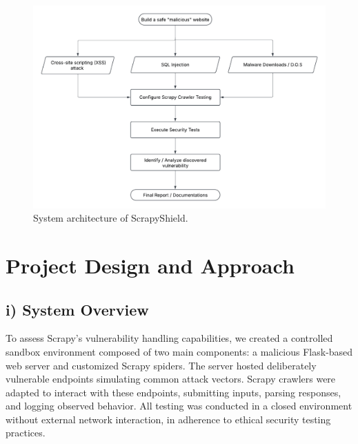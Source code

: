 \begin{figure}[!t]
  \centering
  \includegraphics[width=\textwidth]{figures/blockarch.png}
  \caption{System architecture of ScrapyShield.}
  \label{fig:architecture}
\end{figure}

\section{Project Design and Approach}

\subsection{i) System Overview}
To assess Scrapy’s vulnerability handling capabilities, we created a controlled sandbox environment composed of two main components: a malicious Flask-based web server and customized Scrapy spiders. The server hosted deliberately vulnerable endpoints simulating common attack vectors. Scrapy crawlers were adapted to interact with these endpoints, submitting inputs, parsing responses, and logging observed behavior. All testing was conducted in a closed environment without external network interaction, in adherence to ethical security testing practices.


